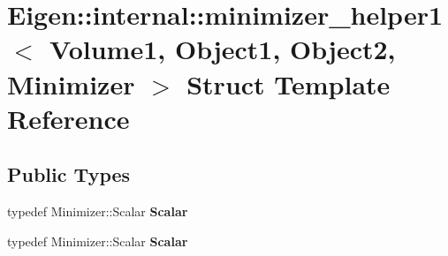 \hypertarget{struct_eigen_1_1internal_1_1minimizer__helper1}{}\section{Eigen\+:\+:internal\+:\+:minimizer\+\_\+helper1$<$ Volume1, Object1, Object2, Minimizer $>$ Struct Template Reference}
\label{struct_eigen_1_1internal_1_1minimizer__helper1}
\subsection*{Public Types}
\begin{DoxyCompactItemize}
\item 
\mbox{\label{struct_eigen_1_1internal_1_1minimizer__helper1_a95d06aea516cd923e81465a72856adcd}} 
typedef Minimizer\+::\+Scalar {\bfseries Scalar}
\item 
\mbox{\label{struct_eigen_1_1internal_1_1minimizer__helper1_a95d06aea516cd923e81465a72856adcd}} 
typedef Minimizer\+::\+Scalar {\bfseries Scalar}
\end{DoxyCompactItemize}
